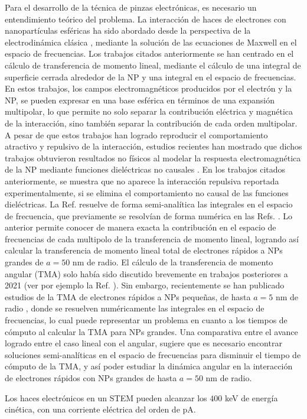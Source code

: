 Para el desarrollo de la técnica de pinzas electrónicas, es necesario un entendimiento teórico del problema. La interacción de haces de electrones con nanopartículas esféricas ha sido abordado desde la perspectiva de la electrodinámica clásica \cite{GarciadeAbajo0, PRBCoronado, Lagos2, Batson2, xu2010transmission}, mediante la solución de las ecuaciones de Maxwell en el espacio de frecuencias. Los trabajos citados anteriormente se han centrado en el cálculo de transferencia de momento lineal, mediante el cálculo de una integral de superficie cerrada alrededor de la NP y una integral en el espacio de frecuencias. En estos trabajos, los campos electromagnéticos producidos por el electrón y la NP, se pueden expresar en una base esférica en términos de una expansión multipolar, lo que permite no solo separar la contribución eléctrica y magnética de la interacción, sino también separar la contribución de cada orden multipolar. A pesar de que estos trabajos han logrado reproducir el comportamiento atractivo y repulsivo de la interacción, estudios recientes han mostrado que dichos trabajos obtuvieron resultados no físicos al modelar la respuesta electromagnética de la NP mediante funciones dieléctricas no causales \cite{castrejon2021effects, castrejon2021phdthesis}. En los trabajos citados anteriormente, se muestra que no aparece la interacción repulsiva reportada experimentalmente, si se elimina el comportamiento no causal de las funciones dieléctricas. La Ref. \cite{castrejon2021phdthesis} resuelve de forma semi-analítica las integrales en el espacio de frecuencia, que previamente se resolvían de forma numérica en las Refs. \cite{GarciadeAbajo0, PRBCoronado, Lagos2, Batson2, xu2010transmission}. Lo anterior permite conocer de manera exacta la contribución en el espacio de frecuencias de cada multipolo de la transferencia de momento lineal, logrando así calcular la transferencia de momento lineal total de electrones rápidos a NPs grandes de $a=50$ nm de radio. El cálculo de la transferencia de momento angular (TMA) solo había sido discutido brevemente en trabajos posteriores a 2021 (ver por ejemplo la Ref. \cite{GarciadeAbajo-1}). Sin embargo, recientemente se han publicado estudios de la TMA de electrones rápidos a NPs pequeñas, de hasta $a=5$ nm de radio \cite{castellanos2021phdthesis, castellanos2021angular,castellanos2023theory}, donde se resuelven numéricamente las integrales en el espacio de frecuencias, lo cual puede representar un problema en cuanto a los tiempos de cómputo al calcular la TMA para NPs grandes. Una comparativa entre el avance logrado entre el caso lineal con el angular, sugiere que es necesario encontrar soluciones semi-analíticas en el espacio de frecuencias para disminuir el tiempo de cómputo de la TMA, y así poder estudiar la dinámica angular en la interacción de electrones rápidos con NPs grandes de hasta $a=50$ nm de radio.

Los haces electrónicos en un STEM pueden alcanzar los $400$ keV de energía cinética, con una corriente eléctrica del orden de pA.
